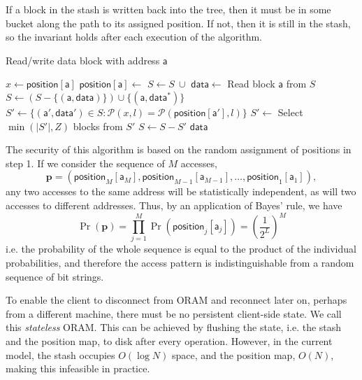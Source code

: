 \documentclass[12pt,a4paper,twoside,openright]{report}
\begin{document}
If a block in the stash is written back into the tree, then it must be in some bucket along the path to its assigned position. If not, then it is still in the stash, so the invariant holds after each execution of the algorithm.

\begin{algorithm}[h]
\caption{Read/write data block with address $\mathsf{a}$}
\label{alg:access}
\footnotesize
\begin{algorithmic}[1]
    \vskip 10pt
    \vskip 10pt
    \State $x \gets \mathsf{position[a]}$
    \State $\mathsf{position[a]} \gets$ 
    \vskip 10pt
        \State $S \gets S~\cup$ 
    \EndFor
    \vskip 10pt
    \State $\mathsf{data} \gets$ Read block $\mathsf{a}$ from $S$
        \State $S \gets (S - \{(\mathsf{a,data})\}) \cup \{(\mathsf{a,data^*})\}$
    \EndIf
    \vskip 10pt
        \State $S' \gets \{(\mathsf{a',data'}) \in S : \mathcal{P}(x,l) = \mathcal{P}(\mathsf{position[a']},l)\}$
        \State $S' \gets$ Select $\min(|S'|,Z)$ blocks from $S'$
        \State $S \gets S - S'$
        \State {}
    \EndFor
    \vskip 10pt
    \State \Return $\mathsf{data}$
    \vskip 10pt
    \EndFunction
    \vskip 10pt
\end{algorithmic}
\end{algorithm}

The security of this algorithm is based on the random assignment of positions in step 1. If we consider the sequence of $M$ accesses, $$\mathbf{p} = (\mathsf{position}_M[\mathsf{a}_M], \mathsf{position}_{M-1}[\mathsf{a}_{M-1}], \dots, \mathsf{position}_1[\mathsf{a}_1]),$$ any two accesses to the same address will be statistically independent, as will two accesses to different addresses. Thus, by an application of Bayes' rule, we have $$\Pr(\mathbf{p}) = \prod\limits^{M}_{j=1}\Pr(\mathsf{position}_j[\mathsf{a}_j]) = \left(\frac{1}{2^L}\right)^M$$ i.e. the probability of the whole sequence is equal to the product of the individual probabilities, and therefore the access pattern is indistinguishable from a random sequence of bit strings.

To enable the client to disconnect from ORAM and reconnect later on, perhaps from a different machine, there must be no persistent client-side state. We call this \emph{stateless} ORAM. This can be achieved by flushing the state, i.e. the stash and the position map, to disk after every operation. However, in the current model, the stash occupies $O(\log N)$ space, and the position map, $O(N)$, making this infeasible in practice.
\end{document}
